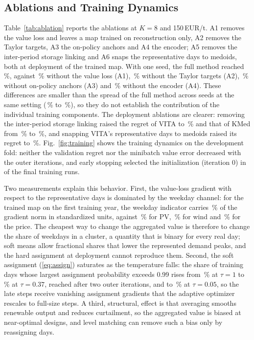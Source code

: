 \documentclass[journal]{IEEEtran}
\begin{document}


\subsection{Ablations and Training Dynamics}
Table~\ref{tab:ablation} reports the ablations at $K=8$ and 150\,EUR/t. A1 removes the value loss and leaves a map trained on reconstruction only, A2 removes the Taylor targets, A3 the on-policy anchors and A4 the encoder; A5 removes the inter-period storage linking and A6 snaps the representative days to medoids, both at deployment of the trained map. With one seed, the full method reached \AblFull\,\%, against \AblOne\,\% without the value loss (A1), \AblTwo\,\% without the Taylor targets (A2), \AblThree\,\% without on-policy anchors (A3) and \AblFour\,\% without the encoder (A4). These differences are smaller than the spread of the full method across seeds at the same setting (\VITASeedMinKeight\,\% to \VITASeedMaxKeight\,\%), so they do not establish the contribution of the individual training components. The deployment ablations are clearer: removing the inter-period storage linking raised the regret of VITA to \AblFive\,\% and that of KMed from \AblBase\,\% to \AblBaseFive\,\%, and snapping VITA's representative days to medoids raised its regret to \AblSix\,\%. Fig.~\ref{fig:training} shows the training dynamics on the development fold: neither the validation regret nor the minibatch value error decreased with the outer iterations, and early stopping selected the initialization (iteration 0) in \NInitSelected{} of the \NRuns{} final training runs.




Two measurements explain this behavior. First, the value-loss gradient with respect to the representative days is dominated by the weekday channel: for the trained map on the first training year, the weekday indicator carries \GradShareWeekday\,\% of the gradient norm in standardized units, against \GradSharePV\,\% for PV, \GradShareWind\,\% for wind and \GradSharePrice\,\% for the price. The cheapest way to change the aggregated value is therefore to change the share of weekdays in a cluster, a quantity that is binary for every real day; soft means allow fractional shares that lower the represented demand peaks, and the hard assignment at deployment cannot reproduce them. Second, the soft assignment (\ref{eq:assign}) saturates as the temperature falls: the share of training days whose largest assignment probability exceeds 0.99 rises from \SatTauOne\,\% at $\tau=1$ to \SatTauLate\,\% at $\tau=0.37$, reached after two outer iterations, and to \SatTauEnd\,\% at $\tau=0.05$, so the late steps receive vanishing assignment gradients that the adaptive optimizer rescales to full-size steps. A third, structural, effect is that averaging smooths renewable output and reduces curtailment, so the aggregated value is biased at near-optimal designs, and level matching can remove such a bias only by reassigning days.
\end{document}
